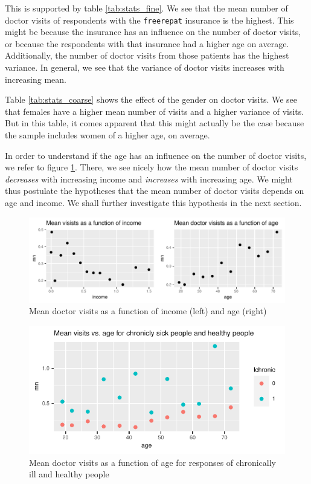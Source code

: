\documentclass[a4paper,11pt]{article}
\begin{document}
This is supported by table \ref{tab:stats_fine}. We see that the mean number of doctor visits of respondents with the \texttt{freerepat} insurance is the highest. This might be because the insurance has an influence on the number of doctor visits, or because the respondents with that insurance had a higher age on average. Additionally, the number of doctor visits from those patients has the highest variance. In general, we see that the variance of doctor visits increases with increasing mean.



Table \ref{tab:stats_coarse} shows the effect of the gender on doctor visits. We see that females have a higher mean number of visits and a higher variance of visits. But in this table, it comes apparent that this might actually be the case because the sample includes women of a higher age, on average.



In order to understand if the age has an influence on the number of doctor visits, we refer to figure \ref{fig:scatter_income_and_age}. There, we see nicely how the mean number of doctor visits \emph{decreases} with increasing income and \emph{increases} with increasing age. We might thus postulate the hypotheses that the mean number of doctor visits depends on age and income. We shall further investigate this hypothesis in the next section.

\begin{figure}[h]
	\centering
\includegraphics{../plots/mean_vs_income_and_age.pdf}
	\caption{Mean doctor visits as a function of income (left) and age (right)}
		\label{fig:scatter_income_and_age}
\end{figure}

\begin{figure}[h]
	\centering
\includegraphics{../plots/mean_vs_age_and_chronic.pdf}

\caption{Mean doctor visits as a function of age for responses of chronically ill and healthy people}
\label{fig:scatter_age_and_chronic}
\end{figure}
\end{document}

